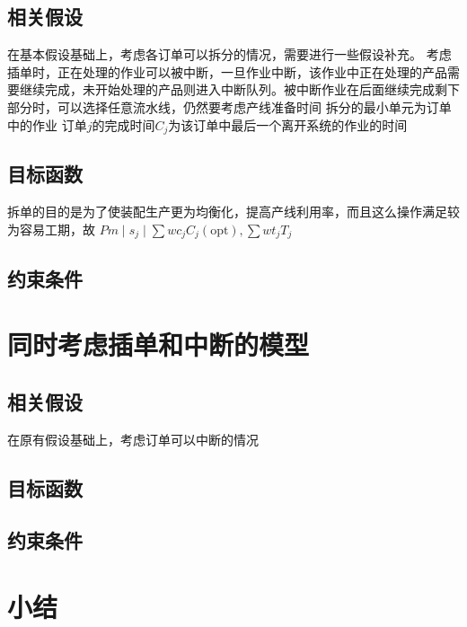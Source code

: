 \subsection{相关假设}
在基本假设基础上，考虑各订单可以拆分的情况，需要进行一些假设补充。
考虑插单时，正在处理的作业可以被中断，一旦作业中断，该作业中正在处理的产品需要继续完成，未开始处理的产品则进入中断队列。被中断作业在后面继续完成剩下部分时，可以选择任意流水线，仍然要考虑产线准备时间
拆分的最小单元为订单中的作业
订单$j$的完成时间$C_j$为该订单中最后一个离开系统的作业的时间

\subsection{目标函数}
拆单的目的是为了使装配生产更为均衡化，提高产线利用率，而且这么操作满足较为容易工期，故
$Pm\mid s_j\mid \sum wc_jC_j(\text{opt}), \sum wt_jT_j$
\subsection{约束条件}
\section{同时考虑插单和中断的模型}
\subsection{相关假设}
在原有假设基础上，考虑订单可以中断的情况
\subsection{目标函数}
\subsection{约束条件}

\section{小结}